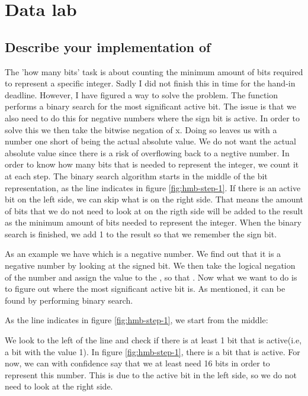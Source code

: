 \section{Data lab}

\subsection{Describe your implementation of }
The 'how many bits' task is about counting the minimum amount of bits required to represent a specific integer.
Sadly I did not finish this in time for the hand-in deadline. However, I have figured a way to 
solve the problem. The function performs a binary search for the most significant active bit.
The issue is that we also need to do this for negative numbers where the sign bit is active. In order to 
solve this we then take the bitwise negation of x. Doing so leaves us with a number one short of being the
actual absolute value. We do not want the actual absolute value since there is a risk of overflowing back to a negtive number. 
In order to know how many bits that is needed to represent the integer, we count it at each step.
The binary search algorithm starts in the middle of the bit representation, as the line indicates in figure \ref{fig:hmb-step-1}. If there is an active bit on the left side,
we can skip what is on the right side. That means the amount of bits that we do not need to look at on the 
rigth side will be added to the result as the minimum amount of bits needed to represent the integer. 
When the binary search is finished, we add 1 to the result so that we remember the sign bit.

As an example we have  which is a negative number.
We find out that it is a negative number by looking at the signed bit. We then take the
logical negation of the number and assign the value to the , so that . 
Now what we want to do is to figure out where the most significant active bit is. As mentioned,
it can be found by performing binary search.

As the line indicates in figure \ref{fig:hmb-step-1}, we start from the middle:


We look to the left of the line and check if there is at least 1 bit that is active(i.e, a bit with the value 1). In figure \ref{fig:hmb-step-1}, there is a bit that is active.
For now, we can with confidence say that we at least need 16 bits in order to represent this number. This is due to the
active bit in the left side, so we do not need to look at the right side. 

